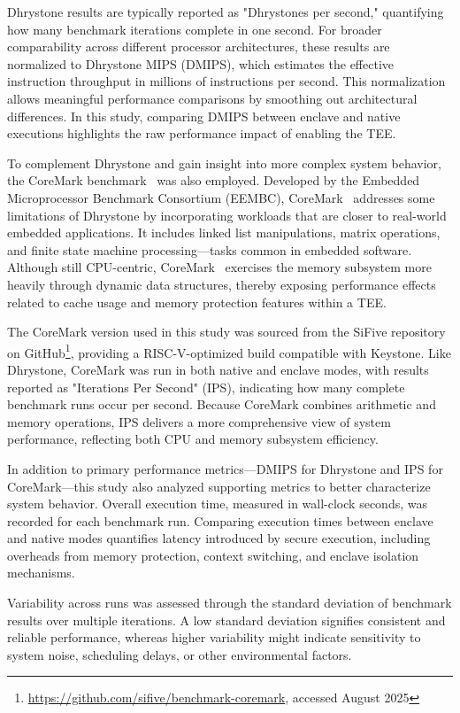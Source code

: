 Dhrystone results are typically reported as "Dhrystones per second," quantifying how many benchmark iterations complete in one second. For broader comparability across different processor architectures, these results are normalized to Dhrystone MIPS (DMIPS), which estimates the effective instruction throughput in millions of instructions per second. This normalization allows meaningful performance comparisons by smoothing out architectural differences. In this study, comparing DMIPS between enclave and native executions highlights the raw performance impact of enabling the TEE.

To complement Dhrystone and gain insight into more complex system behavior, the CoreMark benchmark~\cite{gal2012exploring} was also employed. Developed by the Embedded Microprocessor Benchmark Consortium (EEMBC), CoreMark~\cite{gal2012exploring} addresses some limitations of Dhrystone by incorporating workloads that are closer to real-world embedded applications. It includes linked list manipulations, matrix operations, and finite state machine processing—tasks common in embedded software. Although still CPU-centric, CoreMark~\cite{gal2012exploring} exercises the memory subsystem more heavily through dynamic data structures, thereby exposing performance effects related to cache usage and memory protection features within a TEE.

The CoreMark version used in this study was sourced from the SiFive repository on GitHub\footnote{\url{https://github.com/sifive/benchmark-coremark}, accessed August 2025}, providing a RISC-V-optimized build compatible with Keystone. Like Dhrystone, CoreMark was run in both native and enclave modes, with results reported as "Iterations Per Second" (IPS), indicating how many complete benchmark runs occur per second. Because CoreMark combines arithmetic and memory operations, IPS delivers a more comprehensive view of system performance, reflecting both CPU and memory subsystem efficiency.

In addition to primary performance metrics—DMIPS for Dhrystone and IPS for CoreMark—this study also analyzed supporting metrics to better characterize system behavior. Overall execution time, measured in wall-clock seconds, was recorded for each benchmark run. Comparing execution times between enclave and native modes quantifies latency introduced by secure execution, including overheads from memory protection, context switching, and enclave isolation mechanisms.

Variability across runs was assessed through the standard deviation of benchmark results over multiple iterations. A low standard deviation signifies consistent and reliable performance, whereas higher variability might indicate sensitivity to system noise, scheduling delays, or other environmental factors.

